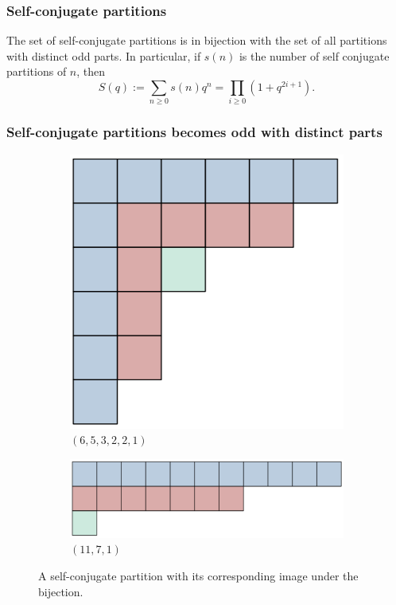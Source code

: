 \documentclass{beamer}
\begin{document}
\begin{frame}
\frametitle{Self-conjugate partitions}
\begin{theorem}
The set of self-conjugate partitions is in bijection with the set of all partitions with distinct odd parts. In particular, if $s(n)$ is the number of self conjugate partitions of $n$, then
$$S(q) := \sum_{n\geq 0}s(n)q^n = \prod_{i\geq 0}(1+q^{2i+1}).$$
\end{theorem}
\end{frame}

\begin{frame}
\frametitle{Self-conjugate partitions becomes odd with distinct parts}

\begin{figure}
     \centering
     \begin{subfigure}[b]{0.25\textwidth}
         \centering
         \includegraphics[width=\textwidth]{self_conjugate_colored.png}
         \caption{$(6, 5, 3, 2, 2, 1)$}
     \end{subfigure}
     \hfill\pause
     \begin{subfigure}[b]{0.5\textwidth}
         \centering
         \includegraphics[width=\textwidth]{odd_distinct_colored.png}
         \caption{$(11, 7, 1)$}
     \end{subfigure}
        \caption{A self-conjugate partition with its corresponding image under the bijection.}
        \label{fig:three graphs}
\end{figure}


\end{frame}
\end{document}
